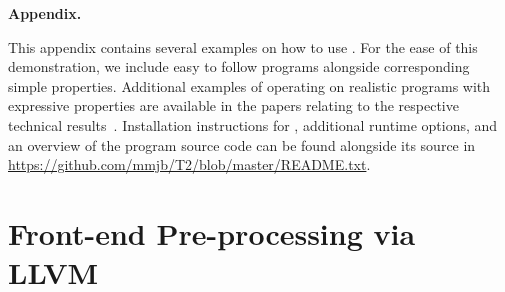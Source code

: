 \noindent
    {\bf \large Appendix.}
\bigskip
    
\noindent
This appendix contains several examples on how to use .
For the ease of this demonstration, we include easy to follow programs alongside
corresponding simple properties. Additional examples of  operating on realistic programs 
with expressive properties are available in the papers relating to the respective technical
results~\cite{Cook13a,Cook14,coo:khl:pit:15}.
Installation instructions for , additional runtime options, and an overview of the program source
code can be found alongside its source in
\url{https://github.com/mmjb/T2/blob/master/README.txt}.


\section{Front-end Pre-processing via LLVM}
\label{llvm}

